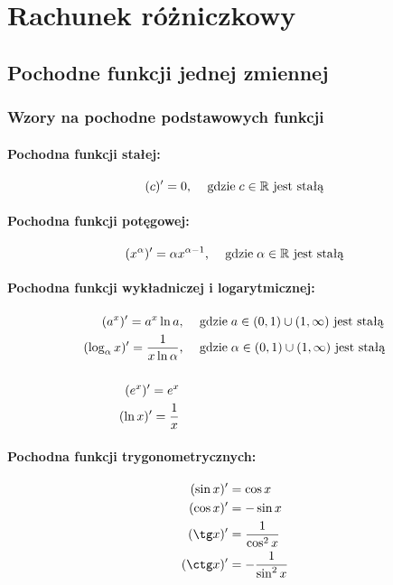 \documentclass[../Matematyka.tex]{subfiles}
\begin{document}
    \section{Rachunek różniczkowy}

    \subsection{Pochodne funkcji jednej zmiennej}

    \subsubsection{Wzory na pochodne podstawowych funkcji}

    \paragraph{Pochodna funkcji stałej:}
    \[ (c)^\prime = 0 \text{, \quad gdzie} \; c \in \mathbb{R} \text{ jest stałą} \]
    
    \paragraph{Pochodna funkcji potęgowej:}
    \[ (x^\alpha)^\prime = \alpha x^{\alpha-1} \text{, \quad gdzie} \; \alpha \in \mathbb{R} \text{ jest stałą} \]
    
    \paragraph{Pochodna funkcji wykładniczej i logarytmicznej:}
    \begin{align*}
        (a^x)^\prime = a^x \ln a &\text{, \quad gdzie} \; a \in (0, 1) \cup (1, \infty) \text{ jest stałą} \\
        (\log_\alpha x)^\prime = \frac{1}{x \ln \alpha} &\text{, \quad gdzie} \; \alpha \in (0, 1) \cup (1, \infty) \text{ jest stałą} \\
        \\
        (e^x)^\prime = e^x \\
        (\ln x)^\prime = \frac{1}{x}
    \end{align*}

    \paragraph{Pochodna funkcji trygonometrycznych:}
    \begin{align*}
        (\sin x)\prim &= \cos x \\
        (\cos x)\prim &= - \sin x \\
        (\tg x)\prim &= \frac{1}{\cos^2 x} \\
        (\ctg x)\prim &= - \frac{1}{\sin^2 x} \\
    \end{align*}
\end{document}
